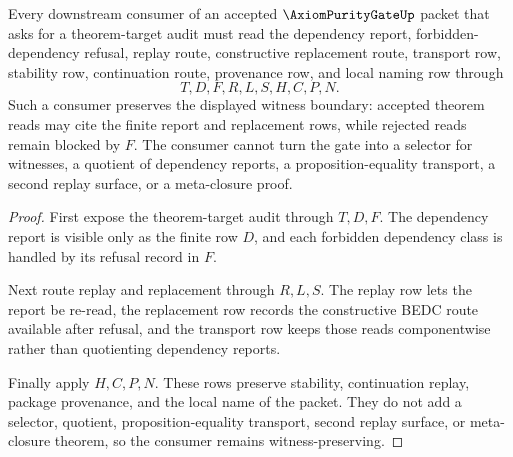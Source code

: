 \begin{theorem}
\label{thm:axiom-purity-gate-witness-preserving-consumer}
Every downstream consumer of an accepted $\AxiomPurityGateUp$ packet that asks for a theorem-target audit must read the dependency report, forbidden-dependency refusal, replay route, constructive replacement route, transport row, stability row, continuation route, provenance row, and local naming row through
$$
T,D,F,R,L,S,H,C,P,N.
$$
Such a consumer preserves the displayed witness boundary: accepted theorem reads may cite the finite report and replacement rows, while rejected reads remain blocked by $F$. The consumer cannot turn the gate into a selector for witnesses, a quotient of dependency reports, a proposition-equality transport, a second replay surface, or a meta-closure proof.
\end{theorem}
\begin{proof}
First expose the theorem-target audit through $T,D,F$. The dependency report is visible only as the finite row $D$, and each forbidden dependency class is handled by its refusal record in $F$.

Next route replay and replacement through $R,L,S$. The replay row lets the report be re-read, the replacement row records the constructive BEDC route available after refusal, and the transport row keeps those reads componentwise rather than quotienting dependency reports.

Finally apply $H,C,P,N$. These rows preserve stability, continuation replay, package provenance, and the local name of the packet. They do not add a selector, quotient, proposition-equality transport, second replay surface, or meta-closure theorem, so the consumer remains witness-preserving.
\end{proof}

